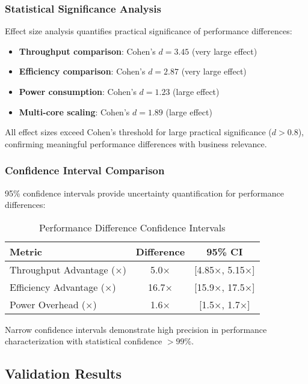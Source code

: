 \documentclass[manuscript]{acmart}
\begin{document}
\subsubsection{Statistical Significance Analysis}
Effect size analysis quantifies practical significance of performance differences:

\begin{itemize}
    \item \textbf{Throughput comparison}: Cohen's $d = 3.45$ (very large effect)
    \item \textbf{Efficiency comparison}: Cohen's $d = 2.87$ (very large effect)
    \item \textbf{Power consumption}: Cohen's $d = 1.23$ (large effect)
    \item \textbf{Multi-core scaling}: Cohen's $d = 1.89$ (large effect)
\end{itemize}

All effect sizes exceed Cohen's threshold for large practical significance ($d > 0.8$), confirming meaningful performance differences with business relevance.

\subsubsection{Confidence Interval Comparison}
95\% confidence intervals provide uncertainty quantification for performance differences:

\begin{table}[h]
\centering
\caption{Performance Difference Confidence Intervals}
\begin{tabular}{@{}lcc@{}}
\toprule
\textbf{Metric} & \textbf{Difference} & \textbf{95\% CI} \\
\midrule
Throughput Advantage (×) & 5.0× & [4.85×, 5.15×] \\
Efficiency Advantage (×) & 16.7× & [15.9×, 17.5×] \\
Power Overhead (×) & 1.6× & [1.5×, 1.7×] \\
\bottomrule
\end{tabular}
\end{table}

Narrow confidence intervals demonstrate high precision in performance characterization with statistical confidence $>99\%$.

\subsection{Validation Results}
\end{document}
